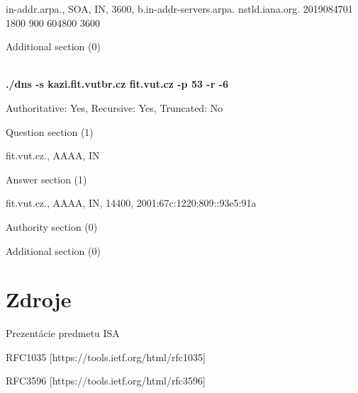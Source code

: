 \documentclass[a4paper,11pt]{article}
\begin{document}
 in-addr.arpa., SOA, IN, 3600, b.in-addr-servers.arpa. nstld.iana.org. 2019084701 1800 900 
 604800 3600

Additional section (0)\\
\\
\newpage

\textbf{./dns -s kazi.fit.vutbr.cz fit.vut.cz -p 53 -r -6}

Authoritative: Yes, Recursive: Yes, Truncated: No

Question section (1)

 fit.vut.cz., AAAA, IN

Answer section (1)

 fit.vut.cz., AAAA, IN, 14400, 2001:67c:1220:809::93e5:91a

Authority section (0)

Additional section (0)


\section{Zdroje}
\begin{compactitem}
\item Prezentácie predmetu ISA
\item RFC1035 [https://tools.ietf.org/html/rfc1035]
\item RFC3596 [https://tools.ietf.org/html/rfc3596]
\end{compactitem}
\end{document}
